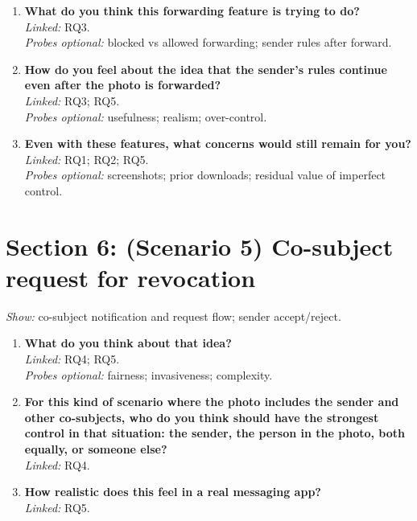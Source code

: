\begin{enumerate}[resume]
  \item \textbf{What do you think this forwarding feature is trying to do?}\\
  \textit{Linked:} RQ3.\\
  \textit{Probes optional:} blocked vs allowed forwarding; sender rules after forward.

  \item \textbf{How do you feel about the idea that the sender's rules continue even after the photo is forwarded?}\\
  \textit{Linked:} RQ3; RQ5.\\
  \textit{Probes optional:} usefulness; realism; over-control.

  \item \textbf{Even with these features, what concerns would still remain for you?}\\
  \textit{Linked:} RQ1; RQ2; RQ5.\\
  \textit{Probes optional:} screenshots; prior downloads; residual value of imperfect control.
\end{enumerate}

\section{Section 6: (Scenario 5) Co-subject request for revocation}
\textit{Show:} co-subject notification and request flow; sender accept/reject.


\begin{enumerate}[resume]
  \item \textbf{What do you think about that idea?}\\
  \textit{Linked:} RQ4; RQ5.\\
  \textit{Probes optional:} fairness; invasiveness; complexity.

  \item \textbf{For this kind of scenario where the photo includes the sender and other co-subjects, who do you think should have the strongest control in that situation: the sender, the person in the photo, both equally, or someone else?}\\
  \textit{Linked:} RQ4.

  \item \textbf{How realistic does this feel in a real messaging app?}\\
  \textit{Linked:} RQ5.
\end{enumerate}

